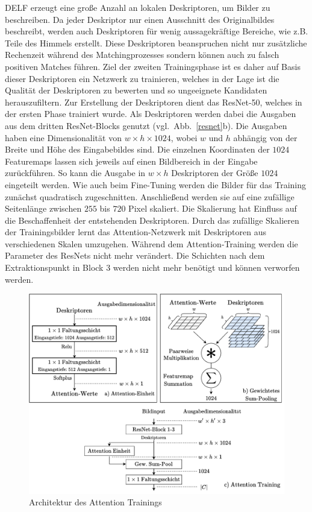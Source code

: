 DELF erzeugt eine große Anzahl an lokalen Deskriptoren, um Bilder zu beschreiben. Da jeder Deskriptor nur einen Ausschnitt des Originalbildes beschreibt, werden auch Deskriptoren für wenig aussagekräftige Bereiche, wie z.B. Teile des Himmels erstellt. Diese Deskriptoren beanspruchen nicht nur zusätzliche Rechenzeit während des Matchingprozesses sondern können auch zu falsch positiven Matches führen. Ziel der zweiten Trainingsphase ist es daher auf Basis dieser Deskriptoren ein Netzwerk zu trainieren, welches in der Lage ist die Qualität der Deskriptoren zu bewerten und so ungeeignete Kandidaten herauszufiltern. 
Zur Erstellung der Deskriptoren dient das ResNet-50, welches in der ersten Phase trainiert wurde. Als Deskriptoren werden dabei die Ausgaben aus dem dritten ResNet-Blocks genutzt (vgl.~Abb.~\ref{resnet}b). Die Ausgaben haben eine Dimensionalität von $w\times h\times 1024$, wobei $w$ und $h$ abhängig von der Breite und Höhe des Eingabebildes sind. Die einzelnen Koordinaten der $1024$ Featuremaps lassen sich jeweils auf einen Bildbereich in der Eingabe zurückführen. So kann die Ausgabe in $w \times h$ Deskriptoren der Größe $1024$ eingeteilt werden. Wie auch beim Fine-Tuning werden die Bilder für das Training zunächst quadratisch zugeschnitten. Anschließend werden sie auf eine zufällige Seitenlänge zwischen $255$ bis $720$ Pixel skaliert. Die Skalierung hat Einfluss auf die Beschaffenheit der entstehenden Deskriptoren. Durch das zufällige Skalieren der Trainingsbilder lernt das Attention-Netzwerk mit Deskriptoren aus verschiedenen Skalen umzugehen. Während dem Attention-Training werden die Parameter des ResNets nicht mehr verändert. Die Schichten nach dem Extraktionspunkt in Block 3 werden nicht mehr benötigt und können verworfen werden. \\
\begin{figure}[h]
\centering
\includegraphics[scale=0.77]{attention_spaced.pdf}
\caption{Architektur des Attention Trainings}
\label{attention}
\end{figure}
